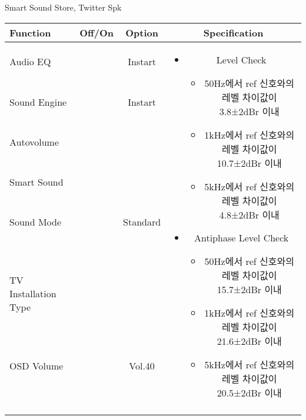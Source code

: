 \begin{frame}[t]{Smart Sound Store, Twitter Spk}
\begin{tiny}
\begin{tabular}{@{}lccc@{}}
\toprule
Function & Off/On & Option & Specification \\
\midrule
Audio EQ & \color{black}{Off} & Instart &
\multirow{10}{60mm}{
\begin{itemize}
	\item Level Check
	\begin{itemize}
		\item 50Hz에서 ref 신호와의 레벨 차이값이 3.8±2dBr 이내
		\item 1kHz에서 ref 신호와의 레벨 차이값이 10.7±2dBr 이내
		\item 5kHz에서 ref 신호와의 레벨 차이값이 4.8±2dBr 이내
	\end{itemize}
	\item Antiphase Level Check
	\begin{itemize}
		\item 50Hz에서 ref 신호와의 레벨 차이값이 15.7±2dBr 이내
		\item 1kHz에서 ref 신호와의 레벨 차이값이 21.6±2dBr 이내
		\item 5kHz에서 ref 신호와의 레벨 차이값이 20.5±2dBr 이내
	\end{itemize}
\end{itemize}
} \\
Sound Engine & \color{blue}{On} & Instart & \\
Autovolume & \color{black}{Off} & & \\
Smart Sound & \color{blue}{On} & & \\
Sound Mode & \color{blue}{On} & Standard & \\
TV Installation Type & \color{blue}{On} & \color{black}{Standtype1} & \\
OSD Volume & \color{blue}{On} & Vol.40 & \\
& & & \\
& & & \\
& & & \\
& & & \\
\midrule
\end{tabular}
\end{tiny}

\end{frame}